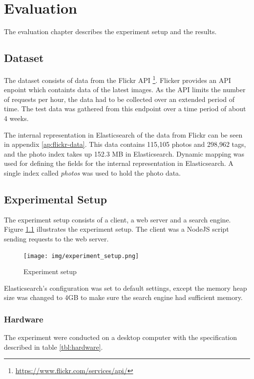 \chapter{Evaluation}
\label{ch:evaluation}
The evaluation chapter describes the experiment setup and the results.

\section{Dataset}
The dataset consists of data from the Flickr API \footnote{\url{https://www.flickr.com/services/api/}}.
Flicker provides an API enpoint which containts data of the latest images.
As the API limits the number of requests per hour, the data had to be collected over an extended period of time.
The test data was gathered from this endpoint over a time period of about 4 weeks.

The internal representation in Elasticsearch of the data from Flickr can be seen in appendix \ref{ap:flickr-data}.
This data contains 115,105 photos and 298,962 tags, and the photo index takes up 152.3 MB in Elasticsearch.
Dynamic mapping was used for defining the fields for the internal representation in Elasticsearch.
A single index called \textit{photos} was used to hold the photo data.

\section{Experimental Setup}

The experiment setup consists of a client, a web server and a search engine.
Figure \ref{fig:experiment-setup} illustrates the experiment setup.
The client was a NodeJS script sending requests to the web server.

\begin{figure}[h!]
  \centering \texttt{[image: img/experiment\_setup.png]}
  \caption{Experiment setup}
  \label{fig:experiment-setup}
\end{figure}

Elasticsearch's configuration was set to default settings,
except the memory heap size was changed to 4GB to make sure the search engine had sufficient memory.

\subsection{Hardware}
The experiment were conducted on a desktop computer with the specification described in table \ref{tbl:hardware}.

